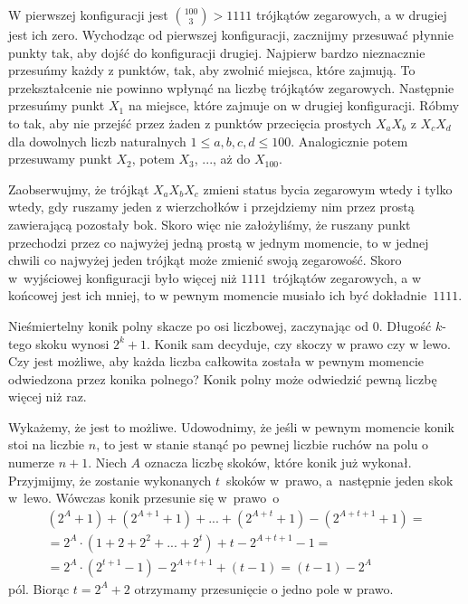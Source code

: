 \noindent
W pierwszej konfiguracji jest ${{{100}\choose{3}} > 1111}$ trójkątów zegarowych, a w drugiej jest ich zero. Wychodząc od pierwszej konfiguracji, zacznijmy przesuwać płynnie punkty tak, aby dojść do konfiguracji drugiej. Najpierw bardzo nieznacznie przesuńmy każdy z punktów, tak, aby zwolnić miejsca, które zajmują. To przekształcenie nie powinno wpłynąć na liczbę trójkątów zegarowych. Następnie przesuńmy punkt $X_1$ na miejsce, które zajmuje on w drugiej konfiguracji. Róbmy to tak, aby nie przejść przez żaden z punktów przecięcia prostych $X_aX_b$ z $X_cX_d$ dla dowolnych liczb naturalnych $1 \leqslant a, b, c, d \leqslant 100$. Analogicznie potem przesuwamy punkt $X_2$, potem $X_3$, ..., aż do $X_{100}$.

\vspace{10px}
\noindent
Zaobserwujmy, że trójkąt $X_aX_bX_c$ zmieni status bycia zegarowym wtedy i tylko wtedy, gdy ruszamy jeden z wierzchołków i przejdziemy nim przez prostą zawierającą pozostały bok. Skoro więc nie założyliśmy, że ruszany punkt przechodzi przez co najwyżej jedną prostą w jednym momencie, to w jednej chwili co najwyżej jeden trójkąt może zmienić swoją zegarowość. Skoro w~wyjściowej konfiguracji było więcej niż $1111$~trójkątów zegarowych, a w końcowej jest ich mniej, to w pewnym momencie musiało ich być dokładnie~$1111$.
 
\begin{problem}{5}
	Nieśmiertelny konik polny skacze po osi liczbowej, zaczynając od $0$. Długość $k$-tego skoku wynosi $2^k + 1$. Konik sam decyduje, czy skoczy w prawo czy w lewo. Czy jest możliwe, aby każda liczba całkowita została w pewnym momencie odwiedzona przez konika polnego? Konik polny może odwiedzić pewną liczbę więcej niż raz.
\end{problem}

\noindent
Wykażemy, że jest to możliwe. Udowodnimy, że jeśli w pewnym momencie konik stoi na liczbie $n$, to jest w stanie stanąć po pewnej liczbie ruchów na polu o numerze $n + 1$. Niech $A$ oznacza liczbę skoków, które konik już wykonał. Przyjmijmy, że zostanie wykonanych $t$~skoków w~prawo, a~następnie jeden skok w~lewo. Wówczas konik przesunie się w~prawo~o
\begin{gather*}
	(2^A + 1) + (2^{A + 1} + 1) + ... + (2^{A + t} + 1) - (2^{A + t + 1} + 1 ) = \\
	= 2^A \cdot (1 + 2 + 2^2 + ... + 2^{t}) + t - 2^{A + t + 1} - 1 = \\
	= 2^A \cdot (2^{t + 1} - 1) - 2^{A + t + 1} + (t - 1) = (t - 1) - 2^A
\end{gather*}
pól. Biorąc $t = 2^A + 2$ otrzymamy przesunięcie o jedno pole w prawo. 

